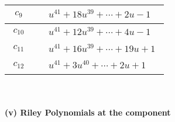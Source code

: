 \documentclass[1p]{elsarticle_modified}
\theoremstyle{definition}
\begin{document}
\begin{tabular}{m{50pt}|m{274pt}}
\hline $$\begin{aligned}c_{9}\end{aligned}$$&$\begin{aligned}
&u^{41}+18 u^{39}+\cdots+2 u-1
\end{aligned}$\\
\hline $$\begin{aligned}c_{10}\end{aligned}$$&$\begin{aligned}
&u^{41}+12 u^{39}+\cdots+4 u-1
\end{aligned}$\\
\hline $$\begin{aligned}c_{11}\end{aligned}$$&$\begin{aligned}
&u^{41}+16 u^{39}+\cdots+19 u+1
\end{aligned}$\\
\hline $$\begin{aligned}c_{12}\end{aligned}$$&$\begin{aligned}
&u^{41}+3 u^{40}+\cdots+2 u+1
\end{aligned}$\\
\hline
\end{tabular}\\~\\
\newpage\renewcommand{\arraystretch}{1}
\flushleft \textbf{(v) Riley Polynomials at the component}\newline \\
\end{document}
